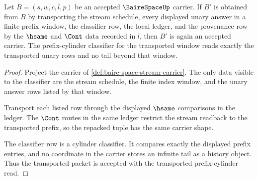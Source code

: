 \begin{theorem}
\label{thm:baire-space-prefix-cylinder-stability}
Let $B=(s,w,c,l,p)$ be an accepted $\BaireSpaceUp$ carrier. If $B'$ is obtained
from $B$ by transporting the stream schedule, every displayed unary answer in a
finite prefix window, the classifier row, the local ledger, and the provenance
row by the $\hsame$ and $\Cont$ data recorded in $l$, then $B'$ is again an
accepted carrier. The prefix-cylinder classifier for the transported window
reads exactly the transported unary rows and no tail beyond that window.
\end{theorem}
\begin{proof}
Project the carrier of \autoref{def:baire-space-stream-carrier}. The only
data visible to the classifier are the stream schedule, the finite index
window, and the unary answer rows listed by that window.

Transport each listed row through the displayed $\hsame$ comparisons in the
ledger. The $\Cont$ routes in the same ledger restrict the stream readback to
the transported prefix, so the repacked tuple has the same carrier shape.

The classifier row is a cylinder classifier. It compares exactly the displayed
prefix entries, and no coordinate in the carrier stores an infinite tail as a
history object. Thus the transported packet is accepted with the transported
prefix-cylinder read.
\end{proof}

